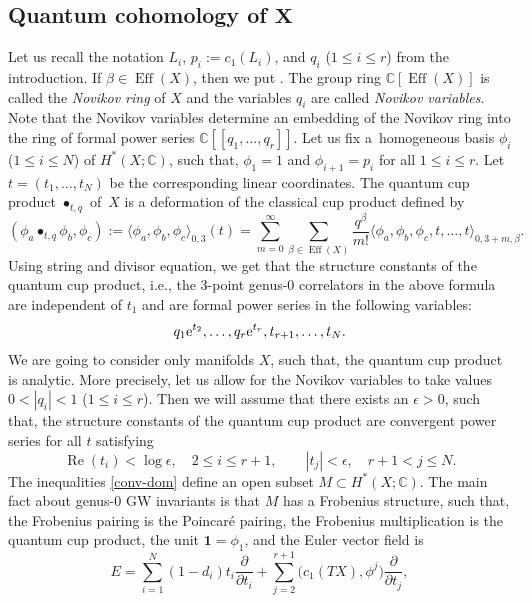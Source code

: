 \documentclass[pdftex]{sigma}
\numberwithin{equation}{section}
\newcommand{\CC}{\mathbb{C}}
\newcommand{\one}{\mathbf{1}}
\begin{document}
\subsection[Quantum cohomology of X]{Quantum cohomology of $\boldsymbol{X}$}\label{sec:qcoh}
Let us recall the notation $L_i$, $p_i:=c_1(L_i)$, and $q_i$ ($1\leq i\leq r$) from the introduction. If $\beta\in \operatorname{Eff}(X)$, then we put
. The group ring
$\CC[\operatorname{Eff}(X)]$ is called the {\em Novikov ring} of $X$
and the variables $q_i$ are called {\em Novikov variables}. Note that
the Novikov variables determine an embedding of the Novikov ring into
the ring of formal power series $\CC[\![q_1,\dots,q_r]\!]$.
Let us fix a~homogeneous basis $\phi_i$ ($1\leq i\leq N$) of $H^*(X;\CC)$, such that, $\phi_1=1$ and $\phi_{i+1}=p_i$ for all $1\leq i\leq r$. Let
$t=(t_1,\dots,t_N)$ be the corresponding linear coordinates. The
quantum cup product $\bullet_{t,q}$ of~$X$ is a deformation of the
classical cup product defined by
\[
(\phi_a\bullet_{t,q} \phi_b,\phi_c):=
\langle \phi_a, \phi_b,\phi_c\rangle_{0,3}(t) =
\sum_{m=0}^\infty
\sum_{\beta\in \operatorname{Eff}(X) }
\frac{q^\beta}{m!}
\langle
\phi_a,\phi_b,\phi_c,t,\dots,t\rangle_{0,3+m,\beta}.
\]
Using string and divisor equation, we get that the structure constants of the
quantum cup product, i.e., the 3-point genus-0 correlators in the above
formula are independent of $t_1$ and are formal power series in the
following variables:
\[
q_1 {\rm e}^{t_2},\dots, q_r {\rm e}^{t_r}, t_{r+1},\dots, t_N.
\]
We are going to consider only manifolds $X$, such that, the quantum
cup product is analytic. More precisely, let us allow for the Novikov
variables to take values $0<|q_i|<1$ ($1\leq i\leq r$). Then we will
assume that there exists an $\epsilon>0$, such that, the structure
constants of the quantum cup product are convergent power series for
all $t$ satisfying
\begin{equation}\label{conv-dom}
\operatorname{Re}(t_i)<\log \epsilon, \quad 2\leq i\leq r+1,\qquad
|t_j|<\epsilon, \quad r+1<j\leq N.
\end{equation}
The inequalities \eqref{conv-dom} define an open subset $M\subset
H^*(X;\CC)$. The main fact about genus-0 GW invariants is that $M$
has a Frobenius structure, such that, the Frobenius pairing is the
Poincar\'e pairing, the Frobenius multiplication is the quantum cup
product, the unit $\one=\phi_1$, and the Euler vector field is
\[
E=\sum_{i=1}^N (1-d_i) t_i \frac{\partial}{\partial t_i} +
\sum_{j=2}^{r+1} \big(c_1(TX),\phi^j\big) \frac{\partial}{\partial t_j},
\]
\end{document}
